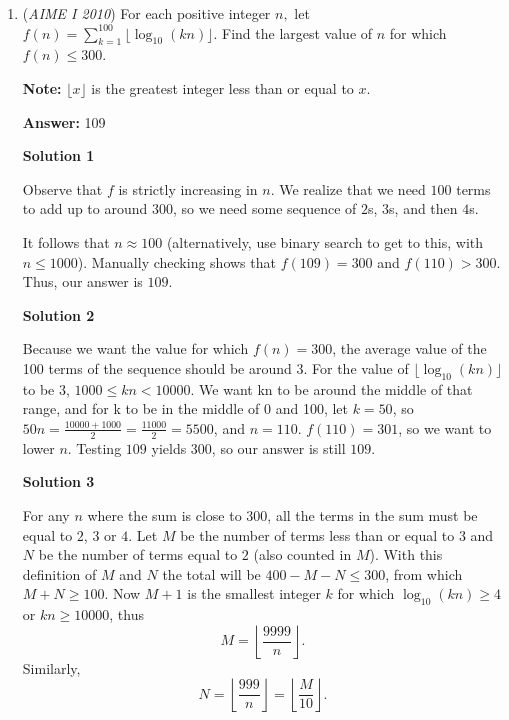 \begin{enumerate}
 Now, $UO=42, NU=21 \Rightarrow [UT'T]=[NUO]=2[NN'U]$. Also $\Delta UT'T \sim \Delta NN'U$. Therefore,
 \[DA=UT'=\sqrt{2} NN'=\sqrt{2} \left(\frac{\sqrt{3}}{2}\cdot 126\right)=63\sqrt{6}\longrightarrow \boxed {069}\]

 \href{https://mathproblemsolvingskills.wordpress.com/}{MathProblemSolvingSkills.com}

 


 


	\item (\textit{AIME I 2010}) For each positive integer $n,$ let $f(n) = \sum_{k = 1}^{100} \lfloor \log_{10} (kn) \rfloor$. Find the largest value of $n$ for which $f(n) \le 300$.


 \textbf{Note:} $\lfloor x \rfloor$ is the greatest integer less than or equal to $x$.


 
 \textbf{Answer: }109



\textbf{Solution 1}

Observe that $f$ is strictly increasing in $n$. We realize that we need $100$ terms to add up to around $300$, so we need some sequence of $2$s, $3$s, and then $4$s.

 It follows that $n \approx 100$ (alternatively, use binary search to get to this, with $n\le 1000$). Manually checking shows that $f(109) = 300$ and $f(110) > 300$. Thus, our answer is $\boxed{109}$.

 



\textbf{Solution 2}

Because we want the value for which $f(n)=300$, the average value of the 100 terms of the sequence should be around $3$. For the value of $\lfloor \log_{10} (kn) \rfloor$ to be $3$, $1000 \le kn < 10000$. We want kn to be around the middle of that range, and for k to be in the middle of 0 and 100, let $k=50$, so $50n=\frac{10000+1000}{2}=\frac{11000}{2}=5500$, and $n = 110$. $f(110) = 301$, so we want to lower $n$. Testing $109$ yields $300$, so our answer is still $\boxed{109}$.

 



\textbf{Solution 3}

For any $n$ where the sum is close to $300$, all the terms in the sum must be equal to $2$, $3$ or $4$. Let $M$ be the number of terms less than or equal to $3$ and $N$ be the number of terms equal to $2$ (also counted in $M$). With this definition of $M$ and $N$ the total will be $400 - M - N \le 300$, from which $M + N \ge 100$. Now $M+1$ is the smallest integer $k$ for which $\log_{10}(kn) \ge 4$ or $kn \ge 10000$, thus 
 \[M = \left\lfloor\frac{9999}{n}\right\rfloor.\] Similarly, 
 \[N = \left\lfloor\frac{999}{n}\right\rfloor = \left\lfloor\frac{M}{10}\right\rfloor.\]


\end{enumerate}
